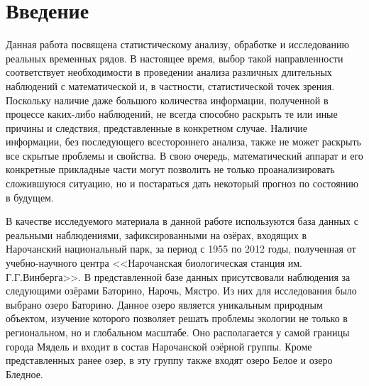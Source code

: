 \newpage

\chapter*{Введение}

Данная работа посвящена статистическому анализу, обработке и исследованию реальных временных рядов. В настоящее время, выбор такой направленности соответствует необходимости в проведении анализа различных длительных наблюдений с математической и, в частности, статистической точек зрения. Поскольку наличие даже большого количества информации, полученной в процессе каких-либо наблюдений, не всегда способно раскрыть те или иные причины и следствия, представленные в конкретном случае. Наличие информации, без последующего всестороннего анализа, также не может раскрыть все скрытые проблемы и свойства. В свою очередь, математический аппарат и его конкретные прикладные части могут позволить не только проанализировать сложившуюся ситуацию, но и постараться дать некоторый прогноз по состоянию в будущем.

В качестве исследуемого материала в данной работе используются база данных с реальными наблюдениями, зафиксированными на озёрах, входящих в Нарочанский национальный парк, за период с 1955 по 2012 годы, полученная от учебно-научного центра <<Нарочанская биологическая станция им. Г.Г.Винберга>>. В представленной базе данных присутсвовали наблюдения за следующими озёрами Баторино, Нарочь, Мястро. Из них для исследования было выбрано озеро Баторино. Данное озеро является уникальным природным объектом, изучение которого позволяет решать проблемы экологии не только в региональном, но и глобальном масштабе. Оно располагается у самой границы города Мядель и входит в состав Нарочанской озёрной группы. Кроме представленных ранее озер, в эту группу также входят озеро Белое и озеро Бледное.

